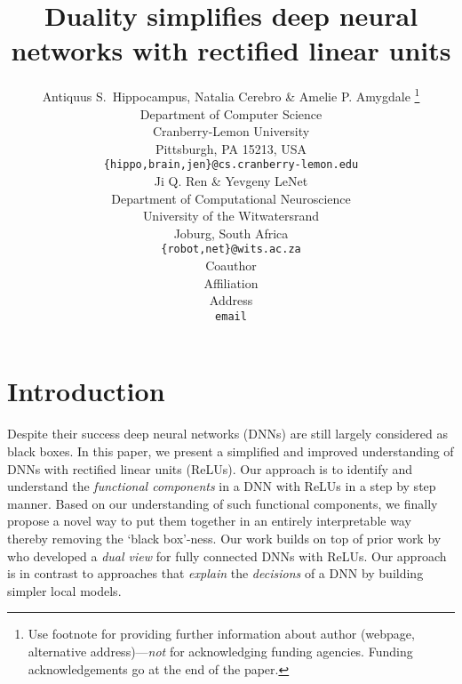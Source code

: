 \documentclass{article} %
\title{Duality simplifies deep neural networks with rectified linear units}
\author{Antiquus S.~Hippocampus, Natalia Cerebro \& Amelie P. Amygdale \thanks{ Use footnote for providing further information
about author (webpage, alternative address)---\emph{not} for acknowledging
funding agencies.  Funding acknowledgements go at the end of the paper.} \\
Department of Computer Science\\
Cranberry-Lemon University\\
Pittsburgh, PA 15213, USA \\
\texttt{\{hippo,brain,jen\}@cs.cranberry-lemon.edu} \\
\And
Ji Q. Ren \& Yevgeny LeNet \\
Department of Computational Neuroscience \\
University of the Witwatersrand \\
Joburg, South Africa \\
\texttt{\{robot,net\}@wits.ac.za} \\
\AND
Coauthor \\
Affiliation \\
Address \\
\texttt{email}
}
\begin{document}
\maketitle





\section{Introduction}

Despite their success deep neural networks (DNNs) are still largely considered as black boxes. In this paper, we present a simplified and improved understanding of DNNs with rectified linear units (ReLUs). Our approach is to identify and understand the \emph{functional components} in a DNN with ReLUs in a step by step manner.  Based on our understanding of such functional components, we finally propose a novel way to put them together in an entirely interpretable way thereby removing the `black box'-ness. Our work builds on top of prior work by \cite{npk} who developed a \emph{dual view} for fully connected DNNs with ReLUs. Our approach is in contrast to approaches that \emph{explain} the \emph{decisions} of a DNN by building simpler local models.
\end{document}
